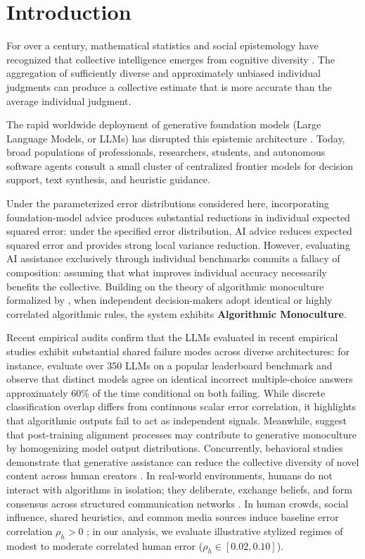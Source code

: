 \documentclass
[letterpaper]{article}
\begin{document}
\section{Introduction}
For over a century, mathematical statistics and social epistemology have recognized that collective intelligence emerges from cognitive diversity \citep{galton1907vox, krogh1995neural, page2007difference, lorenz2011social, becker2017network}. The aggregation of sufficiently diverse and approximately unbiased individual judgments can produce a collective estimate that is more accurate than the average individual judgment.

The rapid worldwide deployment of generative foundation models (Large Language Models, or LLMs) has disrupted this epistemic architecture \citep{bommasani2022opportunities}. Today, broad populations of professionals, researchers, students, and autonomous software agents consult a small cluster of centralized frontier models for decision support, text synthesis, and heuristic guidance.

Under the parameterized error distributions considered here, incorporating foundation-model advice produces substantial reductions in individual expected squared error: under the specified error distribution, AI advice reduces expected squared error and provides strong local variance reduction. However, evaluating AI assistance exclusively through individual benchmarks commits a fallacy of composition: assuming that what improves individual accuracy necessarily benefits the collective. Building on the theory of algorithmic monoculture formalized by \citet{kleinberg2021algorithmic}, when independent decision-makers adopt identical or highly correlated algorithmic rules, the system exhibits \textbf{Algorithmic Monoculture}.

Recent empirical audits confirm that the LLMs evaluated in recent empirical studies exhibit substantial shared failure modes across diverse architectures: for instance, \citet{kim2025correlated} evaluate over 350 LLMs on a popular leaderboard benchmark and observe that distinct models agree on identical incorrect multiple-choice answers approximately 60\% of the time conditional on both failing. While discrete classification overlap differs from continuous scalar error correlation, it highlights that algorithmic outputs fail to act as independent signals. Meanwhile, \citet{wu2025generative} suggest that post-training alignment processes may contribute to generative monoculture by homogenizing model output distributions. Concurrently, behavioral studies demonstrate that generative assistance can reduce the collective diversity of novel content across human creators \citep{doshi2024generative}. In real-world environments, humans do not interact with algorithms in isolation; they deliberate, exchange beliefs, and form consensus across structured communication networks \citep{watts1998collective, barabasi1999emergence, golub2010naive, zollman2007communication}. In human crowds, social influence, shared heuristics, and common media sources induce baseline error correlation $\rho_h > 0$ \citep{lorenz2011social, soll2009strategies, becker2017network}; in our analysis, we evaluate illustrative stylized regimes of modest to moderate correlated human error ($\rho_h \in [0.02, 0.10]$).
\end{document}
